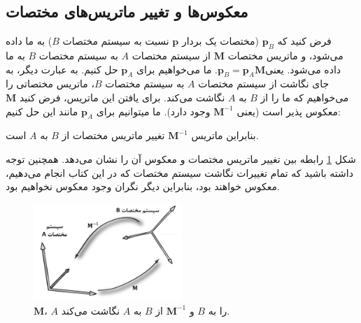 \subsection{\textbf{معکوس‌ها و تغییر ماتریس‌های مختصات}}
\label{subsec:3.4.5}
{
    \Large
    \begin{spacing}{1.5}
        فرض کنید که $\textbf{p}_{B}$ (مختصات یک بردار $\textbf{p}$ نسبت به سیستم مختصات $B$) به ما داده می‌شود، و ماتریس مختصات $\textbf{M}$ از سیستم مختصات $A$ به سیستم مختصات $B$ به ما داده می‌شود.
        یعنی$\textbf{p}_{B}=\textbf{p}_{A}\textbf{M}$. ما می‌خواهیم برای $\textbf{p}_{A}$ حل کنیم.
        به عبارت دیگر، به جای نگاشت از سیستم مختصات $A$ به سیستم مختصات $B$، ماتریس مختصاتی را می‌خواهیم که ما را از $B$ به $A$ نگاشت می‌کند.
        برای یافتن این ماتریس، فرض کنید $\textbf{M}$ معکوس پذیر است (یعنی $\textbf{M}^{-1}$ وجود دارد). ما میتوانیم برای $\textbf{p}_{A}$ مانند این حل کنیم:

        \begin{flushleft}
        \end{flushleft}

        بنابراین ماتریس $\textbf{M}^{-1}$ تغییر ماتریس مختصات از $B$ به $A$ است.

        شکل \ref{fig:4.Session.1.3.13} رابطه بین تغییر ماتریس مختصات و معکوس آن را نشان می‌دهد.
        همچنین توجه داشته باشید که تمام تغییرات نگاشت سیستم مختصات که در این کتاب انجام می‌دهیم، معکوس خواهند بود، بنابراین دیگر نگران وجود معکوس نخواهیم بود.

        \begin{figure}[H]
            \centering
            \setlength{\belowcaptionskip}{-10pt}
            \includegraphics[width=0.5\textwidth]{Images/4/3/4.Session.1.3.13}
            \caption {$\textbf{M}$، $A$ را به $B$ و $\textbf{M}^{-1}$ از $B$ به $A$ نگاشت می‌کند.}
            \label{fig:4.Session.1.3.13}
        \end{figure}


\end{spacing}}
